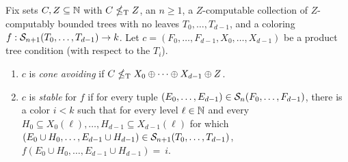 \begin{definition} 
	Fix sets $C,Z \subseteq \mathbb{N}$ with $C \nleq_{\text{\upshape T}} Z$, an $n \geq 1$, a 
	$Z$-computable collection of $Z$-computably bounded trees with no leaves $T_0, \dots, T_{d-1}$, and a coloring $f: \mathcal{S}_{n+1}({T_0, \dots, T_{d-1}}) \to k$. Let $c = (F_0, \dots, F_{d-1}, X_0, \dots, X_{d-1})$ be a product tree condition (with respect to the $T_i$).
	\begin{enumerate}
		\item $c$ is \emph{cone avoiding} if $C \nleq_{\text{\upshape T}} X_0 \oplus \dots \oplus X_{d-1} \oplus Z$.
		\item $c$ is \emph{stable} for $f$ if for every tuple $( E_0, \dots, E_{d-1} ) \in \mathcal{S}_{n}({F_0, \dots, F_{d-1}})$, there is a color $i < k$ such that for every level $\ell \in \mathbb{N}$ and every $H_0 \subseteq X_0(\ell), \dots, H_{d-1} \subseteq X_{d-1}(\ell)$ for which $( E_0 \cup H_0, \dots, E_{d-1} \cup H_{d-1} ) \in \mathcal{S}_{n+1}({T_0, \dots, T_{d-1}})$, $f( E_0 \cup H_0, \dots, E_{d-1} \cup H_{d-1} ) =~i$.
	\end{enumerate}
\end{definition}



